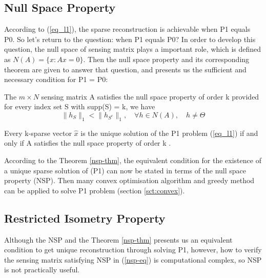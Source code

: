\subsection{Null Space Property}

According to (\ref{eq_l1}), the sparse reconstruction is achievable when P1 equals P0. So let’s return to the question: when P1 equals P0? In order to develop this question, the null space of sensing matrix plays a important role, which is defined as $N(A) = \{x: Ax = 0 \}$. Then the null space property and its corresponding theorem are given to answer that question, and presents us the sufficient and necessary condition for P1 = P0:
\begin{Def}
The $m \times N$ sensing matrix A satisfies the null space property of order k provided for every index set S with supp(S) = k, we have
\begin{equation}
\label{nsp-eq}
\| h_S \|_1 < \|h_{S^c}\|_1, \quad \forall h \in N(A), \quad h \neq \Theta
\end{equation}
\end{Def}
\begin{theorem}
\label{nsp-thm}
Every k-sparse vector $\hat x$ is the unique solution of the P1 problem (\ref{eq_l1}) if and only if A satisfies the null space property of order k \cite{devore2007deterministic}.
\end{theorem}
According to the Theorem \ref{nsp-thm}, the equivalent condition for the existence of a unique sparse solution of (P1) can now be stated in terms of the null space property (NSP). Then many convex optimisation algorithm and greedy method can be applied to solve P1 problem (section \ref{sct:convex}).

\subsection{Restricted Isometry Property}\label{sct:rip}

Although the NSP and the Theorem \ref{nsp-thm} presents us an equivalent condition to get unique reconstruction through solving P1, however, how to verify the sensing matrix satisfying NSP in (\ref{nsp-eq}) is computational complex, so NSP is not practically useful.

